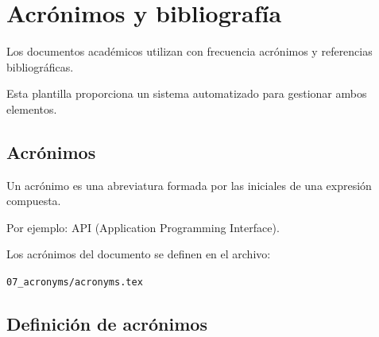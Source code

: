 %
%
%
%
%
%
%
%
%


\chapter{Acrónimos y bibliografía}

Los documentos académicos utilizan con frecuencia
acrónimos y referencias bibliográficas.

Esta plantilla proporciona un sistema automatizado
para gestionar ambos elementos.




\section{Acrónimos}

\begin{definitionbox}[Acrónimo]
Un acrónimo es una abreviatura formada por las
iniciales de una expresión compuesta.

Por ejemplo: API (Application Programming Interface).
\end{definitionbox}

Los acrónimos del documento se definen en el archivo:

\texttt{07\_acronyms/acronyms.tex}




\section{Definición de acrónimos}

